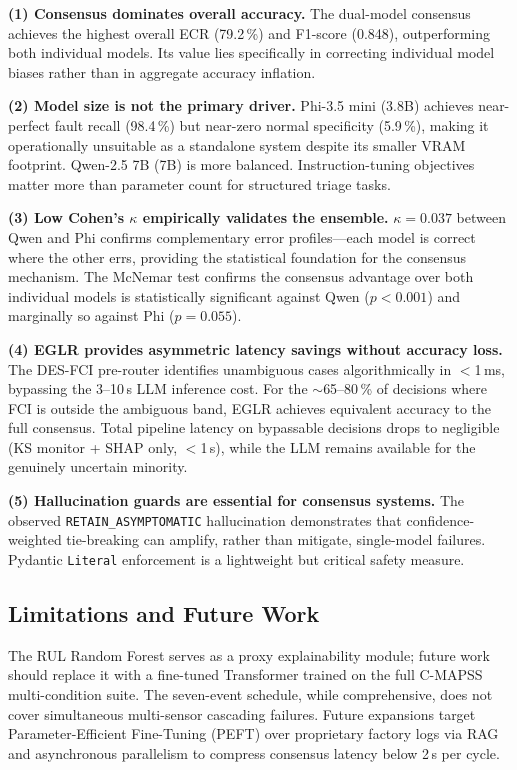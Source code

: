 \documentclass[conference, 10pt]{IEEEtran}
\begin{document}
\textbf{(1) Consensus dominates overall accuracy.} The dual-model consensus achieves the highest overall ECR (79.2\,\%) and F1-score (0.848), outperforming both individual models. Its value lies specifically in correcting individual model biases rather than in aggregate accuracy inflation.

\textbf{(2) Model size is not the primary driver.} Phi-3.5 mini (3.8B) achieves near-perfect fault recall (98.4\,\%) but near-zero normal specificity (5.9\,\%), making it operationally unsuitable as a standalone system despite its smaller VRAM footprint. Qwen-2.5 7B (7B) is more balanced. Instruction-tuning objectives matter more than parameter count for structured triage tasks.

\textbf{(3) Low Cohen's $\kappa$ empirically validates the ensemble.} $\kappa = 0.037$ between Qwen and Phi confirms complementary error profiles---each model is correct where the other errs, providing the statistical foundation for the consensus mechanism. The McNemar test confirms the consensus advantage over both individual models is statistically significant against Qwen ($p < 0.001$) and marginally so against Phi ($p = 0.055$).

\textbf{(4) EGLR provides asymmetric latency savings without accuracy loss.} The DES-FCI pre-router identifies unambiguous cases algorithmically in $<$1\,ms, bypassing the 3--10\,s LLM inference cost. For the $\sim$65--80\,\% of decisions where FCI is outside the ambiguous band, EGLR achieves equivalent accuracy to the full consensus. Total pipeline latency on bypassable decisions drops to negligible (KS monitor + SHAP only, $<$1\,s), while the LLM remains available for the genuinely uncertain minority.

\textbf{(5) Hallucination guards are essential for consensus systems.} The observed \texttt{RETAIN\_ASYMPTOMATIC} hallucination demonstrates that confidence-weighted tie-breaking can amplify, rather than mitigate, single-model failures. Pydantic \texttt{Literal} enforcement is a lightweight but critical safety measure.

\subsection{Limitations and Future Work}
The RUL Random Forest serves as a proxy explainability module; future work should replace it with a fine-tuned Transformer trained on the full C-MAPSS multi-condition suite. The seven-event schedule, while comprehensive, does not cover simultaneous multi-sensor cascading failures. Future expansions target Parameter-Efficient Fine-Tuning (PEFT) over proprietary factory logs via RAG and asynchronous parallelism to compress consensus latency below 2\,s per cycle.
\end{document}
